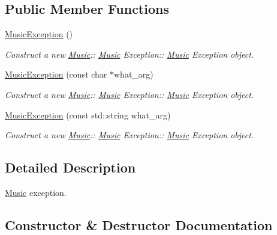 \subsection*{Public Member Functions}
\begin{DoxyCompactItemize}
\item 
\mbox{\label{class_music_1_1_music_exception_a2f9eacea3206495d0d9753ae487dd7ff}} 
\hyperlink{class_music_1_1_music_exception_a2f9eacea3206495d0d9753ae487dd7ff}{Music\+Exception} ()
\begin{DoxyCompactList}\small\item\em Construct a new \hyperlink{class_music}{Music}\+:\+: \hyperlink{class_music}{Music} Exception\+:\+: \hyperlink{class_music}{Music} Exception object. \end{DoxyCompactList}\item 
\hyperlink{class_music_1_1_music_exception_aeb2397817b7e416690fb0e5ba6318fd4}{Music\+Exception} (const char $\ast$what\+\_\+arg)
\begin{DoxyCompactList}\small\item\em Construct a new \hyperlink{class_music}{Music}\+:\+: \hyperlink{class_music}{Music} Exception\+:\+: \hyperlink{class_music}{Music} Exception object. \end{DoxyCompactList}\item 
\hyperlink{class_music_1_1_music_exception_a4bbf9e4a506fcb9d41eb87f0b1c642ba}{Music\+Exception} (const std\+::string what\+\_\+arg)
\begin{DoxyCompactList}\small\item\em Construct a new \hyperlink{class_music}{Music}\+:\+: \hyperlink{class_music}{Music} Exception\+:\+: \hyperlink{class_music}{Music} Exception object. \end{DoxyCompactList}\end{DoxyCompactItemize}


\subsection{Detailed Description}
\hyperlink{class_music}{Music} exception. 

\subsection{Constructor \& Destructor Documentation}
\mbox{\label{class_music_1_1_music_exception_aeb2397817b7e416690fb0e5ba6318fd4}} 
